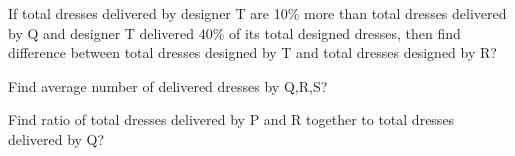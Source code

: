 \documentclass{exam}
\begin{document}
\begin{multicols}{2}
\begin{questions}
    
\begin{randomizechoices}
\end{randomizechoices}

\question   If total dresses delivered by designer T are 10\% more than total dresses delivered by Q and designer T delivered 40\% of its total designed dresses, then find difference between total dresses designed by T and total dresses designed by R?

\begin{randomizechoices}
\end{randomizechoices}

\question   Find average number of delivered dresses by Q,R,S?

\begin{randomizechoices}
\end{randomizechoices}

\question   Find ratio of total dresses delivered by P and R together to total dresses delivered by Q?

\begin{randomizechoices}
\end{randomizechoices}


\end{questions}
\end{multicols}
\end{document}
